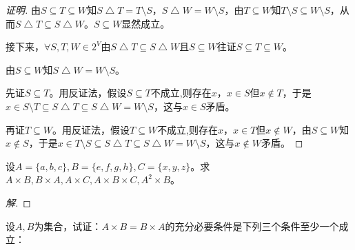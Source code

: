 \documentclass{article}
\begin{document}
\begin{CJK}{UTF8}{gbsn}
\begin{proof}[证明]
  由$S \subseteq T \subseteq W$知$S \bigtriangleup T = T\setminus S$，$S \bigtriangleup W = W\setminus S$，由$T\subseteq W$知$T\setminus S \subseteq W\setminus S$，从而$S \bigtriangleup T \subseteq S \bigtriangleup W$。$S \subseteq W$显然成立。

  接下来，$\forall S,T,W \in 2^V$由$S \bigtriangleup T \subseteq S \bigtriangleup W$且$S \subseteq W$往证$S \subseteq T \subseteq W$。

  由$S\subseteq W$知$S\bigtriangleup W = W\setminus S$。
  
  先证$S\subseteq T$。用反证法，假设$S\subseteq T$不成立,则存在$x$，$x\in S$但$x \notin T$，于是$x\in S\setminus T\subseteq S\bigtriangleup T \subseteq S\bigtriangleup W = W\setminus S$，这与$x\in S$矛盾。

  再证$T\subseteq W$。用反证法，假设$T\subseteq W$不成立,则存在$x$，$x\in T$但$x \notin W$，由$S\subseteq W$知$x\notin S$，于是$x \in T\setminus S \subseteq S\bigtriangleup T \subseteq S\bigtriangleup W = W\setminus S$，这与$x\notin W$矛盾。
\end{proof}

\begin{Exercise}
  设$A=\{a,b,c\}, B=\{e,f,g,h\}, C=\{x,y,z\}$。求$A\times B, B\times A, A\times C, A\times B \times C, A^2\times B$。
\end{Exercise}
\begin{proof}[解]
\end{proof}
\begin{Exercise}
  设$A,B$为集合，试证：$A\times B= B\times A$的充分必要条件是下列三个条件至少一个成立：


\end{Exercise}
\end{CJK}
\end{document}
